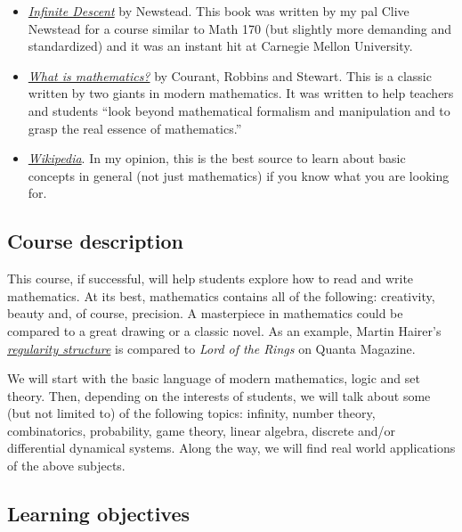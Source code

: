 \documentclass[
]{article}
\begin{document}
\begin{itemize}
\item
  \href{https://infinitedescent.xyz/}{\emph{Infinite Descent}} by Newstead. This book was written
  by my pal Clive Newstead for a course similar to Math 170 (but slightly more demanding and standardized) and it was an instant hit at Carnegie Mellon University.
\item
  \href{https://www.amazon.com/Mathematics-Elementary-Approach-Ideas-Methods/dp/0195105192}{\emph{What is mathematics?}} by Courant, Robbins and Stewart. This is a classic written
  by two giants in modern mathematics.
  It was written to help teachers and students ``look beyond mathematical formalism and manipulation and to grasp
  the real essence of mathematics.''
\item
  \href{https://en.wikipedia.org}{\emph{Wikipedia}}. In my opinion, this is the best source
  to learn about basic concepts in general (not just mathematics) if you know what
  you are looking for.
\end{itemize}

\subsection*{Course description}\label{course-description}

This course, if successful, will help students explore how to read and write mathematics.
At its best, mathematics contains all of the following: creativity, beauty and, of course, precision.
A masterpiece in mathematics could be compared to a great drawing or a classic novel.
As an example, Martin Hairer's \href{https://www.quantamagazine.org/hearing-music-in-noise-martin-hairer-wins-the-fields-medal-20140812}{\emph{regularity structure}} is compared to \emph{Lord of the Rings}
on Quanta Magazine.

We will start with the basic language of modern mathematics, logic and set theory.
Then, depending on the interests of students, we will talk about some (but not limited to) of the following topics: infinity, number theory, combinatorics, probability, game theory,
linear algebra, discrete and/or differential dynamical systems.
Along the way, we will find real world applications of the above subjects.

\subsection*{Learning objectives}\label{learning-objectives}
\end{document}
